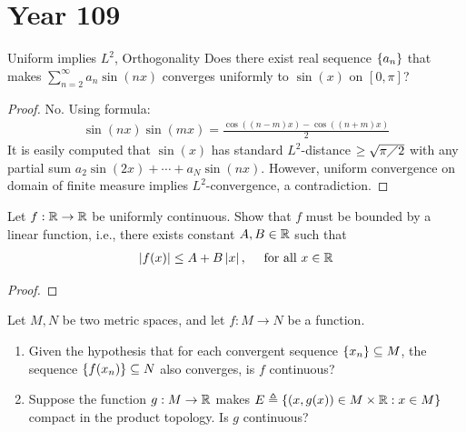 \documentclass{report}
\begin{document}
\section{Year 109}
\begin{question}{Uniform implies $L^2$, Orthogonality}{}
Does there exist real sequence $\left\{ a_n \right\}$ that makes $\sum_{n=2}^{\infty}a_n \sin (nx)$ converges uniformly to $\sin (x)$ on $[0,\pi ]$? 
\end{question}
\begin{proof}
No. Using formula:
\begin{align*}
 \sin (nx) \sin (mx) = \frac{\cos ((n-m)x) - \cos ((n+m)x)}{2}
\end{align*}
It is easily computed that $\sin (x)$ has standard $L^2$-distance $\geq \sqrt{\pi \diagup 2}  $ with any partial sum $a_2 \sin (2x)+\cdots + a_N \sin (nx)$. However, uniform convergence on domain of finite measure implies $L^2$-convergence, a contradiction.  
\end{proof}
\begin{question}{}{}
Let $f:\mathbb{R}\rightarrow \mathbb{R}$ be uniformly continuous. Show that $f$ must be bounded by a linear function, i.e., there exists constant $A,B \in\mathbb{R}$ such that 
\begin{align*}
\left|f(x)\right|\leq A+ B\left|x\right|,\quad \text{ for all }x\in\mathbb{R}
\end{align*}
\end{question}
\begin{proof}

\end{proof}
\begin{question}{}{}
Let $M,N$ be two metric spaces, and let $f:M\rightarrow N$ be a function. 
 \begin{enumerate}[label=(\roman*)]
  \item Given the hypothesis that for each convergent sequence $\left\{ x_n \right\}\subseteq M$, the sequence $\left\{ f(x_n) \right\}\subseteq N$ also converges, is $f$ continuous? 
  \item Suppose the function $g:M\rightarrow \mathbb{R}$ makes $E\triangleq \left\{ (x,g(x))\in M\times \mathbb{R}:x\in M \right\}$ compact in the product topology. Is $g$ continuous? 
\end{enumerate}
\end{question}
\end{document}

